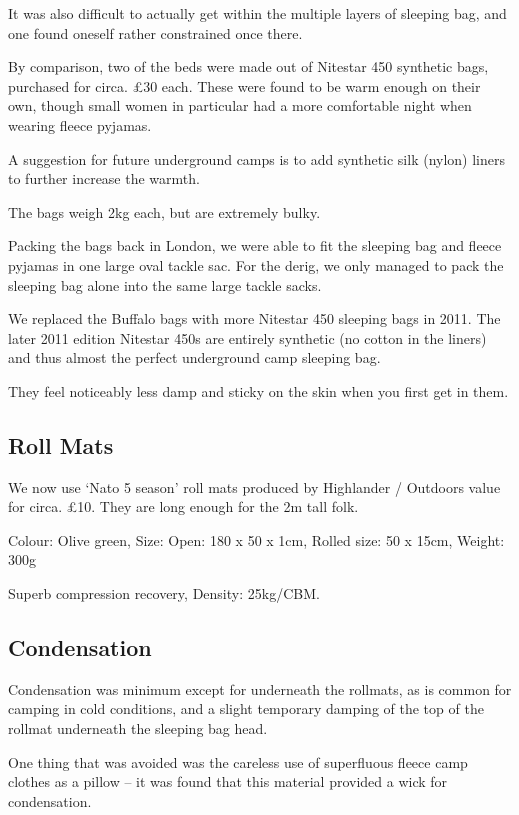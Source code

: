 It was also difficult to actually get within the multiple layers of sleeping bag, and one found oneself rather constrained once there.

By comparison, two of the beds were made out of Nitestar 450 synthetic bags, purchased for circa. £30 each. These were found to be warm enough on their own, though small women in particular had a more comfortable night when wearing fleece pyjamas.

A suggestion for future underground camps is to add synthetic silk (nylon) liners to further increase the warmth.

The bags weigh 2kg each, but are extremely bulky.

Packing the bags back in London, we were able to fit the sleeping bag and fleece pyjamas in one large oval tackle sac. For the derig, we only managed to pack the sleeping bag alone into the same large tackle sacks.

We replaced the Buffalo bags with more Nitestar 450 sleeping bags in 2011. The later 2011 edition Nitestar 450s are entirely synthetic (no cotton in the liners) and thus almost the perfect underground camp sleeping bag.

They feel noticeably less damp and sticky on the skin when you first get in them.


\subsection{Roll Mats}

We now use `Nato 5 season' roll mats produced by Highlander / Outdoors value for circa. £10. They are long enough for the 2m tall folk.

Colour: Olive green, Size: Open: 180 x 50 x 1cm, Rolled size: 50 x 15cm, Weight: 300g

Superb compression recovery, Density: 25kg/CBM.


\subsection{Condensation}

Condensation was minimum except for underneath the rollmats, as is common for camping in cold conditions, and a slight temporary damping of the top of the rollmat underneath the sleeping bag head.

One thing that was avoided was the careless use of superfluous fleece camp clothes as a pillow -- it was found that this material provided a wick for condensation.


